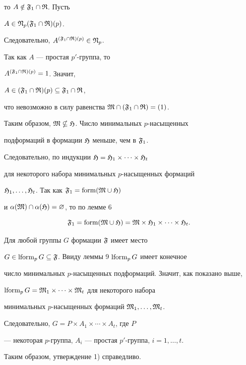 \begin{pf}
то $A\notin\frak F_1\cap\frak R$. Пусть 


$A\in\frak N_p(\frak F_1\cap\frak R)(p)$. 


Следовательно, $A^{(\frak F_1\cap\frak R)(p)}\in\frak N_p$. 


Так как $A$ --- простая $p'$-группа, то 


$A^{(\frak F_1\cap\frak R)(p)}=1$. Значит, 


$A\in(\frak F_1\cap\frak R)(p)\subseteq\frak F_1\cap\frak R$, 


что невозможно в силу равенства $\frak M\cap(\frak F_1\cap\frak R)=(1)$. 


Таким образом, $\frak M\nsubseteq\frak H$. Число минимальных $p$-насыщенных 


подформаций в формации $\frak H$ меньше, чем в $\frak F_1$. 


Следовательно, по индукции $\frak H=\frak H_1\times\dotsb\times\frak H_t$ 


для некоторого набора минимальных $p$-насыщенных формаций 


$\frak H_1,\dotsc,\frak H_t$. Так как $\frak F_1=\operatorname{form}(\frak M\cup\frak H)$ 


и $\alpha(\frak M)\cap\alpha(\frak H)=\varnothing$, то по лемме 6 


$$ 


\frak F_1=\form(\frak M\cup\frak H)= 


\frak M\times\frak H_1\times\dotsb\times\frak H_t. 


$$ 





Для любой группы $G$ формации $\frak F$ имеет место 


$G\in\operatorname{lform}_pG\subseteq\frak F$. Ввиду леммы 9 $\operatorname{lform}_pG$ имеет конечное 


число минимальных $p$-насыщенных подформаций. Значит, как показано выше, 


$\operatorname{lform}_pG=\frak M_1\times\dotsb\times\frak M_t$ для некоторого набора 


минимальных $p$-насыщенных формаций $\frak M_1,\dotsc,\frak M_t$. 


Следовательно, $G=P\times A_1\times\dotsb\times A_t$, где $P$ 


--- некоторая $p$-группа, $A_i$ --- простая $p'$-группа, $i=1,\dotsc,t$. 


Таким образом, утверждение 1) справедливо.


\end{pf} 


